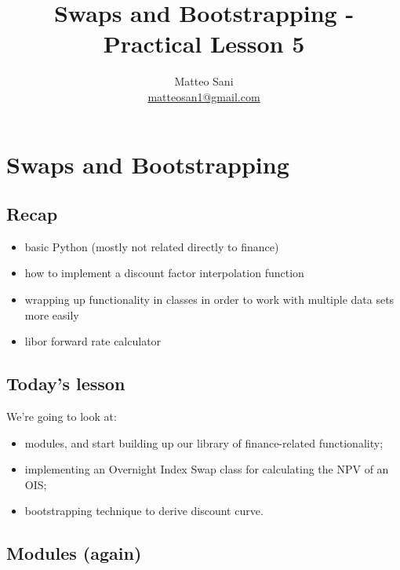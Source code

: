 \documentclass[11pt]{article}
\title{Swaps and Bootstrapping - Practical Lesson 5}
\author{Matteo Sani\\\href{mailto:matteosan1@gmail.com}{matteosan1@gmail.com}}
\providecommand{\tightlist}{%
      \setlength{\itemsep}{0pt}\setlength{\parskip}{0pt}}
\begin{document}
    
    
    \maketitle
    
    

    
    \hypertarget{swaps-and-bootstrapping---practical-lesson-5}{%
\section{Swaps and Bootstrapping}\label{swaps-and-bootstrapping---practical-lesson-5}}

\hypertarget{recap}{%
\subsection{Recap}\label{recap}}

\begin{itemize}
\tightlist
\item
  basic Python (mostly not related directly to finance)
\item
  how to implement a discount factor interpolation function
\item
  wrapping up functionality in classes in order to work with multiple
  data sets more easily
\item
  libor forward rate calculator
\end{itemize}

\hypertarget{todays-lesson}{%
\subsection{Today's lesson}\label{todays-lesson}}

We're going to look at:

\begin{itemize}
\tightlist
\item
  modules, and start building up our library of finance-related
  functionality;
\item
  implementing an Overnight Index Swap class for calculating the NPV of
  an OIS;
\item
  bootstrapping technique to derive discount curve.
\end{itemize}

\hypertarget{modules-again}{%
\subsection{Modules (again)}\label{modules-again}}
\end{document}
